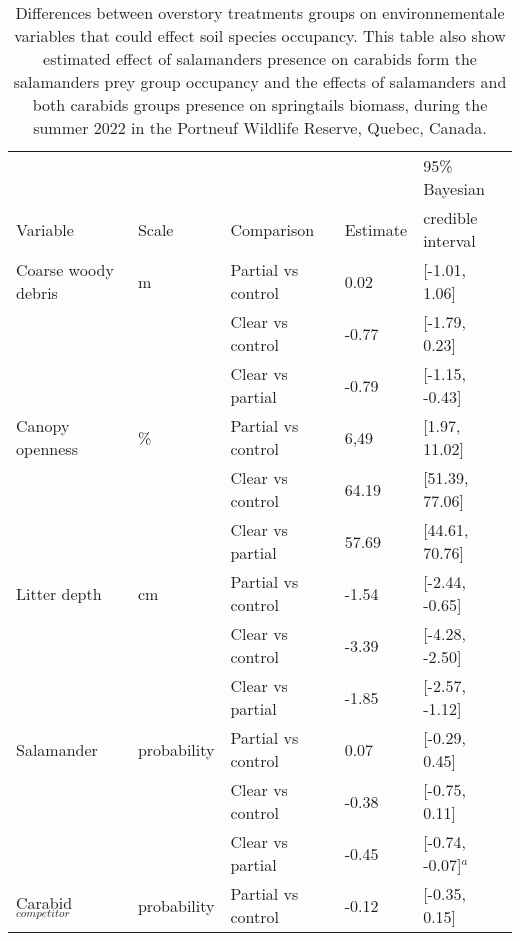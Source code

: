 \begin{table}[ht]
  \centering
  \caption[Differences between overstory treatments groups on environnementale variables and group species occupancy.]
  {Differences between overstory treatments groups on environnementale variables that could effect soil species occupancy. 
  This table also show estimated effect of salamanders presence on carabids form the salamanders prey group occupancy 
  and the effects of salamanders and both carabids groups presence on springtails biomass, during the summer 2022 in the Portneuf Wildlife Reserve,
  Quebec, Canada.}
  \label{tab:overstory}
  \begin{tabular}{lllll} 
      \hline
      &&&&95\% Bayesian \\
      Variable&Scale& Comparison & Estimate &  credible interval \\ [0.5ex] 
      \hline
      Coarse woody debris &m\up{3}& Partial vs control & \hspace{1mm}0.02 & [-1.01, 1.06] \\ 
                 && Clear vs control  & -0.77 & [-1.79, 0.23] \\ 
                          && Clear vs partial  & -0.79 & [-1.15, -0.43] \\
      Canopy openness     &\%& Partial vs control & \hspace{1mm}6,49 & [1.97, 11.02] \\ 
                      && Clear vs control  & \hspace{1mm}64.19 & [51.39, 77.06] \\ 
                          && Clear vs partial  & \hspace{1mm}57.69 & [44.61, 70.76] \\ 
      Litter depth        &cm& Partial vs control & -1.54 & [-2.44, -0.65] \\ 
                      && Clear vs control  & -3.39 & [-4.28, -2.50] \\ 
                          && Clear vs partial  & -1.85 & [-2.57, -1.12] \\       
      Salamander          &probability& Partial vs control & \hspace{1mm}0.07 & [-0.29, 0.45] \\ 
             && Clear vs control  & -0.38 & [-0.75, 0.11] \\ 
                          && Clear vs partial  & -0.45 & [-0.74, -0.07]$^{a}$ \\       
      Carabid$_{competitor}$ &probability& Partial vs control & -0.12 & [-0.35, 0.15] \\

\end{tabular}
\end{table}
